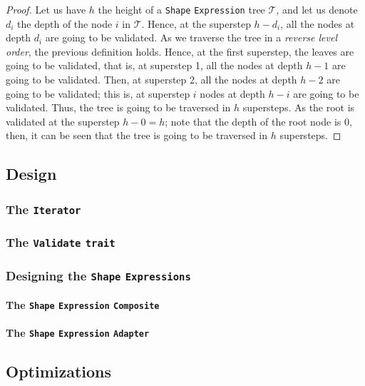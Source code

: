 \begin{proof}
    Let us have $h$ the height of a \texttt{Shape} \texttt{Expression} tree $\mathcal{T}$, and let us denote $d_i$ the depth of the node $i$ in $\mathcal{T}$. Hence, at the superstep $h - d_i$, all the nodes at depth $d_i$ are going to be validated. As we traverse the tree in a \textit{reverse level order}, the previous definition holds. Hence, at the first superstep, the leaves are going to be validated, that is, at superstep 1, all the nodes at depth $h - 1$ are going to be validated. Then, at superstep 2, all the nodes at depth $h - 2$ are going to be validated; this is, at superstep $i$ nodes at depth $h - i$ are going to be validated. Thus, the tree is going to be traversed in $h$ supersteps. As the root is validated at the superstep $h - 0 = h$; note that the depth of the root node is 0, then, it can be seen that the tree is going to be traversed in $h$ supersteps.
\end{proof}

\subsection{Design}

\subsubsection{The \texttt{Iterator}}

\subsubsection{The \texttt{Validate} \texttt{trait}}

\subsubsection{Designing the \texttt{Shape} \texttt{Expressions}}

\paragraph{The \texttt{Shape} \texttt{Expression} \texttt{Composite}}

\paragraph{The \texttt{Shape} \texttt{Expression} \texttt{Adapter}}

\subsection{Optimizations}


